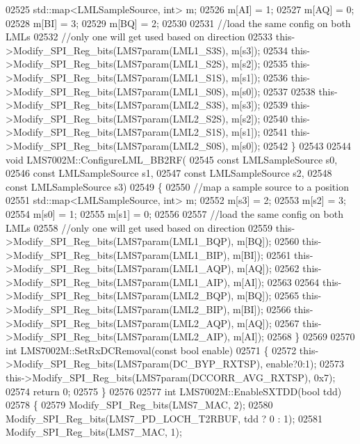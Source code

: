 \begin{DoxyCode}
{{{{{{{{{{{{{{{{{{{{{{{{{{{{{{{{{{{{{{{{{{{{{{{{{{{{{{{{{{{{{{{{02525     std::map<LMLSampleSource, int> m;
02526     m[AI] = 1;
02527     m[AQ] = 0;
02528     m[BI] = 3;
02529     m[BQ] = 2;
02530 
02531     \textcolor{comment}{//load the same config on both LMLs}
02532     \textcolor{comment}{//only one will get used based on direction}
02533     this->Modify_SPI_Reg_bits(LMS7param(LML1_S3S), m[s3]);
02534     this->Modify_SPI_Reg_bits(LMS7param(LML1_S2S), m[s2]);
02535     this->Modify_SPI_Reg_bits(LMS7param(LML1_S1S), m[s1]);
02536     this->Modify_SPI_Reg_bits(LMS7param(LML1_S0S), m[s0]);
02537 
02538     this->Modify_SPI_Reg_bits(LMS7param(LML2_S3S), m[s3]);
02539     this->Modify_SPI_Reg_bits(LMS7param(LML2_S2S), m[s2]);
02540     this->Modify_SPI_Reg_bits(LMS7param(LML2_S1S), m[s1]);
02541     this->Modify_SPI_Reg_bits(LMS7param(LML2_S0S), m[s0]);
02542 \}
02543 
02544 \textcolor{keywordtype}{void} LMS7002M::ConfigureLML_BB2RF(
02545     \textcolor{keyword}{const} LMLSampleSource s0,
02546     \textcolor{keyword}{const} LMLSampleSource s1,
02547     \textcolor{keyword}{const} LMLSampleSource s2,
02548     \textcolor{keyword}{const} LMLSampleSource s3)
02549 \{
02550     \textcolor{comment}{//map a sample source to a position}
02551     std::map<LMLSampleSource, int> m;
02552     m[s3] = 2;
02553     m[s2] = 3;
02554     m[s0] = 1;
02555     m[s1] = 0;
02556 
02557     \textcolor{comment}{//load the same config on both LMLs}
02558     \textcolor{comment}{//only one will get used based on direction}
02559     this->Modify_SPI_Reg_bits(LMS7param(LML1_BQP), m[BQ]);
02560     this->Modify_SPI_Reg_bits(LMS7param(LML1_BIP), m[BI]);
02561     this->Modify_SPI_Reg_bits(LMS7param(LML1_AQP), m[AQ]);
02562     this->Modify_SPI_Reg_bits(LMS7param(LML1_AIP), m[AI]);
02563 
02564     this->Modify_SPI_Reg_bits(LMS7param(LML2_BQP), m[BQ]);
02565     this->Modify_SPI_Reg_bits(LMS7param(LML2_BIP), m[BI]);
02566     this->Modify_SPI_Reg_bits(LMS7param(LML2_AQP), m[AQ]);
02567     this->Modify_SPI_Reg_bits(LMS7param(LML2_AIP), m[AI]);
02568 \}
02569 
02570 \textcolor{keywordtype}{int} LMS7002M::SetRxDCRemoval(\textcolor{keyword}{const} \textcolor{keywordtype}{bool} enable)
02571 \{
02572     this->Modify_SPI_Reg_bits(LMS7param(DC_BYP_RXTSP), enable?0:1);
02573     this->Modify_SPI_Reg_bits(LMS7param(DCCORR_AVG_RXTSP), 0x7);
02574     \textcolor{keywordflow}{return} 0;
02575 \}
02576 
02577 \textcolor{keywordtype}{int} LMS7002M::EnableSXTDD(\textcolor{keywordtype}{bool} tdd)
02578 \{
02579     Modify_SPI_Reg_bits(LMS7_MAC, 2);
02580     Modify_SPI_Reg_bits(LMS7_PD_LOCH_T2RBUF, tdd ? 0 : 1);
02581     Modify_SPI_Reg_bits(LMS7_MAC, 1);
}}}}}}}}}}}}}}}}}}}}}}}}}}}}}}}}}}}}}}}}}}}}}}}}}}}}}}}}}}}}}}}}
\end{DoxyCode}
